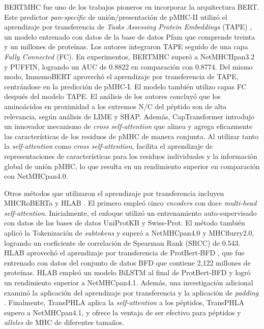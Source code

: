 BERTMHC \citep{cheng2021bertmhc} fue uno de los trabajos pioneros en incorporar la arquitectura BERT. Este predictor \textit{pan-specific} de unión/presentación de pMHC-II utilizó el aprendizaje por transferencia de \textit{Tasks Assessing Protein Embeddings} (TAPE) \citep{rao2019evaluating}, un modelo entrenado con datos de la base de datos Pfam que comprende treinta y un millones de proteínas. Los autores integraron TAPE seguido de una capa \textit{Fully Connected} (FC). En experimentos, BERTMHC superó a NetMHCIIpan3.2 y PUFFIN, logrando un AUC de 0.8822 en comparación con 0.8774. Del mismo modo, ImmunoBERT \citep{gasser2021interpreting} aprovechó el aprendizaje por transferencia de TAPE, centrándose en la predicción de pMHC-I. El modelo también utilizo capas FC después del modelo TAPE. El análisis de los autores concluyó que los aminoácidos en proximidad a los extremos N/C del péptido son de alta relevancia, según análisis de LIME y SHAP. Además, CapTransformer \citep{chen2021jointly} introdujo un innovador mecanismo de \textit{cross self-attention} que alinea y agrega eficazmente las características de los residuos de pMHC de manera conjunta. Al utilizar tanto la \textit{self-attention} como \textit{cross self-attention}, facilita el aprendizaje de representaciones de características para los residuos individuales y la información global de unión pMHC, lo que resulta en un rendimiento superior en comparación con NetMHCpan4.0.



Otros métodos que utilizaron el aprendizaje por transferencia incluyen MHCRoBERTa \citep{wang2022mhcroberta} y HLAB \citep{zhang2022hlab}. El primero empleó cinco \textit{encoders} con doce \textit{multi-head self-attention}. Inicialmente, el enfoque utilizó un entrenamiento auto-supervisado con datos de las bases de datos UniProtKB y Swiss-Prot. El método también aplicó la Tokenización de \textit{subtokens} y superó a NetMHCpan4.0 y MHCflurry2.0, logrando un coeficiente de correlación de Spearman Rank (SRCC) de 0.543. HLAB aprovechó el aprendizaje por transferencia de ProtBert-BFD \citep{elnaggar2021prottrans}, que fue entrenado con datos del conjunto de datos BFD que contiene 2,122 millones de proteínas. HLAB empleó un modelo BiLSTM al final de ProtBert-BFD y logró un rendimiento superior a  NetMHCpan4.1. Además, una investigación adicional examinó la aplicación del aprendizaje por transferencia y la aplicación de \textit{padding} \citep{arceda2023neoantigen}. Finalmente, TransPHLA \citep{chu2022transformer}  aplica la \textit{self-attention} a los péptidos, TransPHLA  supero a  NetMHCpan4.1, y ofrece la ventaja de ser efectivo para péptidos y \textit{alleles} de MHC de diferentes tamaños.

